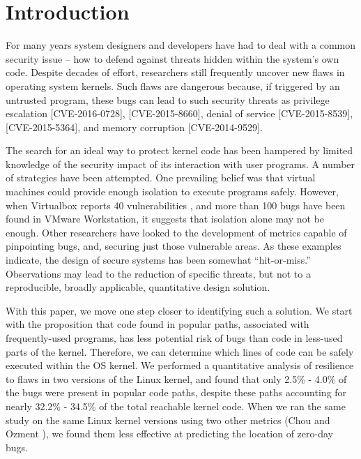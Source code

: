 \section{Introduction}
\label{sec.introduction}

For many years system designers and developers have had to deal with a common security issue --
how to defend against threats hidden within the system's own code. Despite
 decades of effort, researchers still frequently uncover new flaws in operating
 system kernels. Such flaws are dangerous because, if triggered by an untrusted
 program, these bugs can lead to such security threats as privilege escalation
 [CVE-2016-0728], [CVE-2015-8660], denial of service [CVE-2015-8539], [CVE-2015-5364],
  and memory corruption [CVE-2014-9529].

The search for an ideal way to protect kernel code has been hampered by limited
knowledge of the security impact of its interaction with user programs.
A number of strategies have been attempted. One prevailing belief was that virtual
machines could provide enough isolation to execute programs safely.
However, when Virtualbox reports 40 vulnerabilities \cite{Virtualbox-Vulnerabilities},
 and more than 100 bugs have been found in VMware Workstation,
it suggests that isolation alone may not be enough. Other researchers have looked
 to the development of metrics capable of pinpointing bugs, and,
securing just those vulnerable areas\cite{PittSFIeld, ozment2006milk}. As these
examples indicate, the design of secure systems has been somewhat “hit-or-miss.”
 Observations may lead to
 the reduction of specific threats, but not to a reproducible, broadly applicable,
quantitative design solution.

With this paper, we move one step closer to identifying such a solution. We start
 with the proposition that code found in popular paths, associated with frequently-used programs,
has less potential risk of bugs than code in less-used parts of the kernel.
Therefore, we can determine which lines of code can be safely executed
 within the OS kernel. We performed a quantitative analysis of resilience
  to flaws in two versions of the Linux kernel, and
found that only 2.5\% - 4.0\% of the bugs were present in popular code paths,
despite these paths accounting for nearly 32.2\% - 34.5\% of the total reachable kernel code.
When we ran the same study on the same Linux kernel versions using two other metrics
(Chou \cite{PittSFIeld} and Ozment \cite{ozment2006milk}),
we found them less effective at predicting the location of zero-day bugs.

